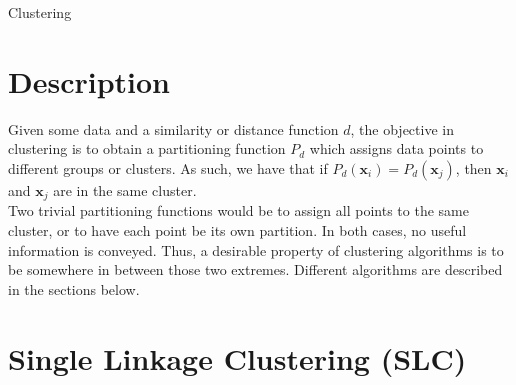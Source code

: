 \documentclass[12pt]{article}
\begin{document}
\begin{center}
	\LARGE{Clustering}
\end{center}

\section{Description}

Given some data and a similarity or distance function $d$, the objective in clustering is to obtain a partitioning function $P_d$ which assigns data points to different groups or clusters. As such, we have that if $P_d(\mathbf{x}_i) = P_d(\mathbf{x}_j)$, then $\mathbf{x}_i$ and $\mathbf{x}_j$ are in the same cluster.
\\\newline
Two trivial partitioning functions would be to assign all points to the same cluster, or to have each point be its own partition. In both cases, no useful information is conveyed. Thus, a desirable property of clustering algorithms is to be somewhere in between those two extremes. Different algorithms are described in the sections below.

\section{Single Linkage Clustering (SLC)}
\end{document}
